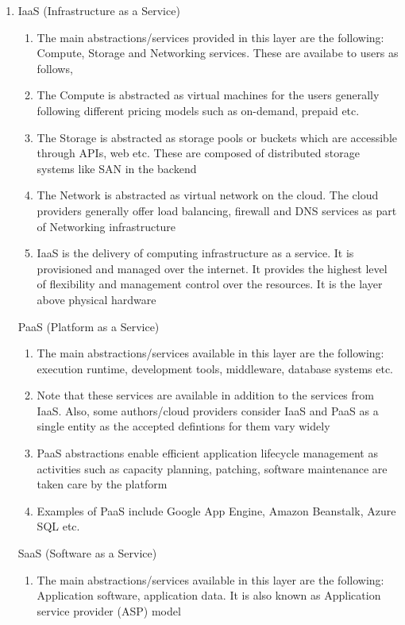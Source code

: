 \documentclass[11pt,a4paper,oneside]{article}
\begin{document}
\begin{enumerate}
       \item IaaS (Infrastructure as a Service)
             \begin{enumerate}
             	\item The main abstractions/services provided in this layer are the following: Compute, Storage and Networking services. These are availabe to users as follows,
             	\item The Compute is abstracted as virtual machines for the users generally following different pricing models such as on-demand, prepaid etc.
             	\item The Storage is abstracted as storage pools or buckets which are accessible through APIs, web etc. These are composed of distributed storage systems like SAN in the backend
             	\item The Network is abstracted as virtual network on the cloud. The cloud providers generally offer load balancing, firewall and DNS services as part of Networking infrastructure
                \item IaaS is the delivery of computing infrastructure as a service. It is provisioned and managed over the internet. It provides the highest level of flexibility and management control over the resources. It is the layer above physical hardware
             \end{enumerate}
             PaaS (Platform as a Service)
             \begin{enumerate}
             	\item The main abstractions/services available in this layer are the following: execution runtime, development tools, middleware, database systems etc.
             	\item Note that these services are available in addition to the services from IaaS. Also, some authors/cloud providers consider IaaS and PaaS as a single entity as the accepted defintions for them vary widely
             	\item PaaS abstractions enable efficient application lifecycle management as activities such as capacity planning, patching, software maintenance are taken care by the platform
             	\item Examples of PaaS include Google App Engine, Amazon Beanstalk, Azure SQL etc. 
             \end{enumerate}
             SaaS (Software as a Service)
             \begin{enumerate}
             	\item The main abstractions/services available in this layer are the following: Application software, application data. It is also known as Application service provider (ASP) model

\end{enumerate}
\end{enumerate}
\end{document}
